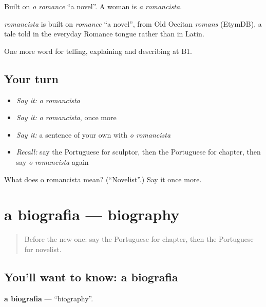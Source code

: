 Built on \emph{o romance} \textquotedblleft{}a novel\textquotedblright{}. A woman is \emph{a romancista}.

\begin{cousinweb}
\emph{romancista} is built on \emph{romance} \textquotedblleft{}a novel\textquotedblright{}, from Old Occitan \emph{romans} (EtymDB), a tale told in the everyday Romance tongue rather than in Latin.
\end{cousinweb}

\begin{grammarlens}[title={What you've built}]
One more word for telling, explaining and describing at B1.
\end{grammarlens}

\subsection*{Your turn}
\begin{itemize}
\raggedright
  \item \emph{Say it:} \emph{o romancista}
  \item \emph{Say it:} \emph{o romancista}, once more
  \item \emph{Say it:} a sentence of your own with \emph{o romancista}
  \item \emph{Recall:} say the Portuguese for sculptor, then the Portuguese for chapter, then say \emph{o romancista} again
\end{itemize}

\begin{tcolorbox}[breakable,colback=teal!4,colframe=teal!35!black,title={Before you move on}]
What does o romancista mean? (\textquotedblleft{}Novelist\textquotedblright{}.) Say it once more.
\end{tcolorbox}
\section[a biografia]{a biografia — biography}

\label{lesson:PT-C523-biografia}



\begin{quote}
Before the new one: say the Portuguese for chapter, then the Portuguese for novelist.
\end{quote}

\subsection*{You'll want to know: a biografia}
\textbf{a biografia} — \textquotedblleft{}biography\textquotedblright{}.

